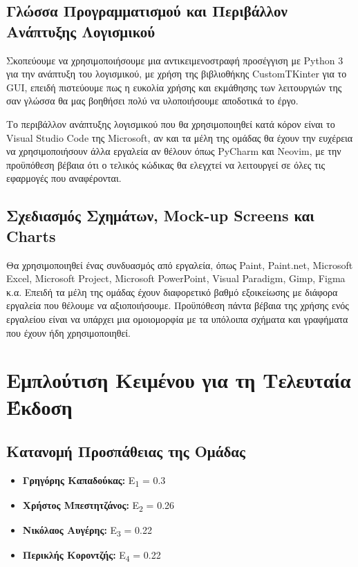 \documentclass[12pt,a4paper]{article}
\begin{document}
\subsection{Γλώσσα Προγραμματισμού και Περιβάλλον Ανάπτυξης Λογισμικού}
Σκοπεύουμε να χρησιμοποιήσουμε μια αντικειμενοστραφή προσέγγιση με Python 3 για την ανάπτυξη του λογισμικού, με χρήση της βιβλιοθήκης CustomTKinter για το GUI, επειδή πιστεύουμε πως η ευκολία χρήσης και εκμάθησης των λειτουργιών της σαν γλώσσα θα μας βοηθήσει πολύ να υλοποιήσουμε αποδοτικά το έργο.

Το περιβάλλον ανάπτυξης λογισμικού που θα χρησιμοποιηθεί κατά κόρον είναι το Visual Studio Code της Microsoft, αν και τα μέλη της ομάδας θα έχουν την ευχέρεια να χρησιμοποιήσουν άλλα εργαλεία αν θέλουν όπως PyCharm και Neovim, με την προϋπόθεση βέβαια ότι ο τελικός κώδικας θα ελεγχτεί να λειτουργεί σε όλες τις εφαρμογές που αναφέρονται.

\subsection{Σχεδιασμός Σχημάτων, Mock-up Screens και Charts}
Θα χρησιμοποιηθεί ένας συνδυασμός από εργαλεία, όπως Paint, Paint.net, Microsoft Excel, Microsoft Project, Microsoft PowerPoint, Visual Paradigm, Gimp, Figma κ.α. Επειδή τα μέλη της ομάδας έχουν διαφορετικό βαθμό εξοικείωσης με διάφορα εργαλεία που θέλουμε να αξιοποιήσουμε. Προϋπόθεση πάντα βέβαια της χρήσης ενός εργαλείου είναι να υπάρχει μια ομοιομορφία με τα υπόλοιπα σχήματα και γραφήματα που έχουν ήδη χρησιμοποιηθεί.

\section{Εμπλούτιση Κειμένου για τη Τελευταία Έκδοση}
\label{Final Chapter}

\subsection{Κατανομή Προσπάθειας της Ομάδας}

\begin{itemize}
    \item \textbf{Γρηγόρης Καπαδούκας:} Ε\textsubscript{1} = 0.3
	\item \textbf{Χρήστος Μπεστητζάνος:} Ε\textsubscript{2} = 0.26
	\item \textbf{Νικόλαος Αυγέρης:} Ε\textsubscript{3} = 0.22
	\item \textbf{Περικλής Κοροντζής:} Ε\textsubscript{4} = 0.22
\end{itemize}
\end{document}
